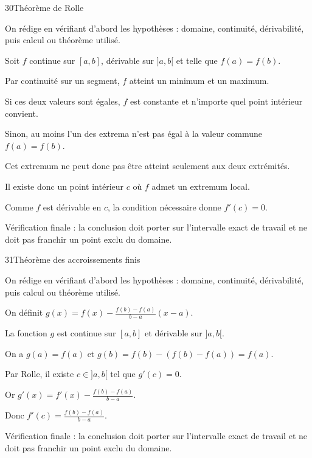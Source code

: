 \documentclass[11pt,a4paper]{article}
\begin{document}
\begin{corrbox}{30}{Théorème de Rolle}

\begin{methodebox}
On rédige en vérifiant d'abord les hypothèses : domaine, continuité, dérivabilité, puis calcul ou théorème utilisé.
\end{methodebox}

Soit $f$ continue sur $[a,b]$, dérivable sur $]a,b[$ et telle que $f(a)=f(b)$.


Par continuité sur un segment, $f$ atteint un minimum et un maximum.


Si ces deux valeurs sont égales, $f$ est constante et n'importe quel point intérieur convient.


Sinon, au moins l'un des extrema n'est pas égal à la valeur commune $f(a)=f(b)$.


Cet extremum ne peut donc pas être atteint seulement aux deux extrémités.


Il existe donc un point intérieur $c$ où $f$ admet un extremum local.


Comme $f$ est dérivable en $c$, la condition nécessaire donne $f'(c)=0$.


\begin{attentionbox}
Vérification finale : la conclusion doit porter sur l'intervalle exact de travail et ne doit pas franchir un point exclu du domaine.
\end{attentionbox}

\end{corrbox}


\begin{corrbox}{31}{Théorème des accroissements finis}

\begin{methodebox}
On rédige en vérifiant d'abord les hypothèses : domaine, continuité, dérivabilité, puis calcul ou théorème utilisé.
\end{methodebox}

On définit $g(x)=f(x)-\frac{f(b)-f(a)}{b-a}(x-a)$.


La fonction $g$ est continue sur $[a,b]$ et dérivable sur $]a,b[$.


On a $g(a)=f(a)$ et $g(b)=f(b)-(f(b)-f(a))=f(a)$.


Par Rolle, il existe $c\in]a,b[$ tel que $g'(c)=0$.


Or $g'(x)=f'(x)-\frac{f(b)-f(a)}{b-a}$.


Donc $f'(c)=\frac{f(b)-f(a)}{b-a}$.


\begin{attentionbox}
Vérification finale : la conclusion doit porter sur l'intervalle exact de travail et ne doit pas franchir un point exclu du domaine.
\end{attentionbox}

\end{corrbox}
\end{document}
